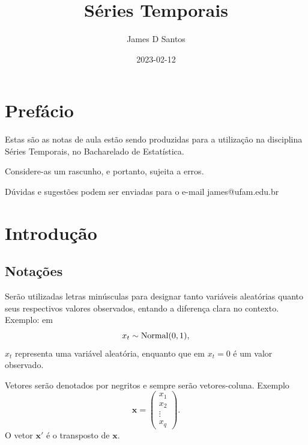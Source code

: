 \documentclass[
  letterpaper,
  DIV=11,
  numbers=noendperiod]{scrreprt}
\title{Séries Temporais}
\author{James D Santos}
\date{2023-02-12}
\renewcommand*\contentsname{Table of contents}
\newcommand\contentsname{Table of contents}
\theoremstyle{plain}
\theoremstyle{definition}
\theoremstyle{definition}
\theoremstyle{remark}
\begin{document}
\maketitle
\ifdefined\Shaded\renewenvironment{Shaded}{\begin{tcolorbox}[interior hidden, borderline west={3pt}{0pt}{shadecolor}, frame hidden, enhanced, breakable, boxrule=0pt, sharp corners]}{\end{tcolorbox}}\fi

\renewcommand*\contentsname{Table of contents}
{
\hypersetup{linkcolor=}
\setcounter{tocdepth}{2}
\tableofcontents
}

\hypertarget{prefuxe1cio}{%
\chapter*{Prefácio}\label{prefuxe1cio}}


Estas são as notas de aula estão sendo produzidas para a utilização na
disciplina Séries Temporais, no Bacharelado de Estatística.

Considere-as um rascunho, e portanto, sujeita a erros.

Dúvidas e sugestões podem ser enviadas para o e-mail james@ufam.edu.br


\hypertarget{introduuxe7uxe3o}{%
\chapter{Introdução}\label{introduuxe7uxe3o}}

\hypertarget{notauxe7uxf5es}{%
\section{Notações}\label{notauxe7uxf5es}}

Serão utilizadas letras minúsculas para designar tanto variáveis
aleatórias quanto seus respectivos valores observados, entando a
diferença clara no contexto. Exemplo: em \[x_t\sim\hbox{Normal}(0,1),\]
\(x_t\) representa uma variável aleatória, enquanto que em \(x_t=0\) é
um valor observado.

Vetores serão denotados por negritos e sempre serão vetores-coluna.
Exemplo
\[\boldsymbol{x}=\left(\begin{array}{c}x_1 \\ x_2 \\ \vdots \\ x_q\end{array}\right).\]
O vetor \(\boldsymbol{x}'\) é o transposto de \(\boldsymbol{x}\).
\end{document}
